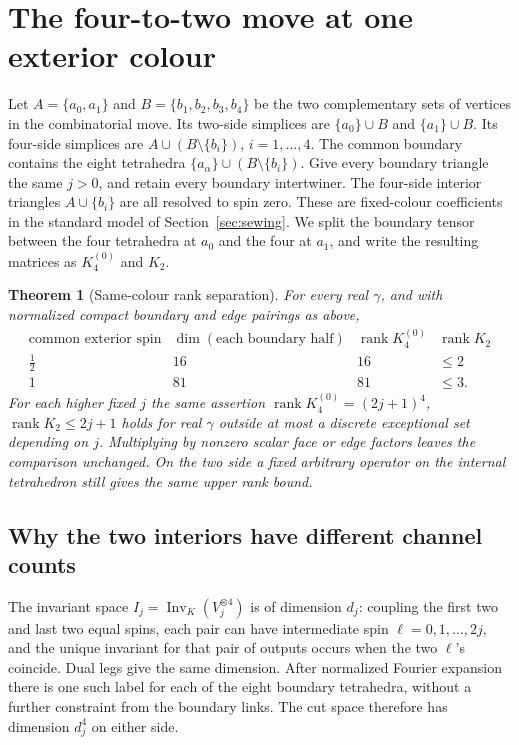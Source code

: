 \documentclass[11pt]{article}
\newtheorem{theorem}{Theorem}
\theoremstyle{remark}
\newcommand{\Inv}{\operatorname{Inv}}
\newcommand{\rank}{\operatorname{rank}}
\begin{document}
\section{The four-to-two move at one exterior colour}\label{sec:pachner}

Let \(A=\{a_0,a_1\}\) and \(B=\{b_1,b_2,b_3,b_4\}\) be the two complementary sets of vertices in the combinatorial move. Its two-side simplices are \(\{a_0\}\cup B\) and \(\{a_1\}\cup B\). Its four-side simplices are \(A\cup(B\setminus\{b_i\})\), \(i=1,\ldots,4\). The common boundary contains the eight tetrahedra \(\{a_\alpha\}\cup(B\setminus\{b_i\})\). Give every boundary triangle the same \(j>0\), and retain every boundary intertwiner. The four-side interior triangles \(A\cup\{b_i\}\) are all resolved to spin zero. These are fixed-colour coefficients in the standard model of Section~\ref{sec:sewing}. We split the boundary tensor between the four tetrahedra at \(a_0\) and the four at \(a_1\), and write the resulting matrices as \(K_4^{(0)}\) and \(K_2\).

\begin{theorem}[Same-colour rank separation]\label{thm:rank}
For every real \(\gamma\), and with normalized compact boundary and edge pairings as above,
\[
\begin{array}{c|ccc}
\text{common exterior spin} & \dim(\text{each boundary half}) & \rank K_4^{(0)} &\rank K_2\\ \hline
\tfrac12 & 16 & 16 & \le 2\\
1 &81 &81 &\le 3 .
\end{array}
\]
For each higher fixed \(j\) the same assertion \(\rank K_4^{(0)}=(2j+1)^4\), \(\rank K_2\le2j+1\) holds for real \(\gamma\) outside at most a discrete exceptional set depending on \(j\). Multiplying by nonzero scalar face or edge factors leaves the comparison unchanged. On the two side a fixed arbitrary operator on the internal tetrahedron still gives the same upper rank bound.
\end{theorem}

\subsection{Why the two interiors have different channel counts}

The invariant space \(I_j=\Inv_K(V_j^{\otimes4})\) is of dimension \(d_j\): coupling the first two and last two equal spins, each pair can have intermediate spin \(\ell=0,1,\ldots,2j\), and the unique invariant for that pair of outputs occurs when the two \(\ell\)'s coincide. Dual legs give the same dimension. After normalized Fourier expansion there is one such label for each of the eight boundary tetrahedra, without a further constraint from the boundary links. The cut space therefore has dimension \(d_j^4\) on either side.
\end{document}
